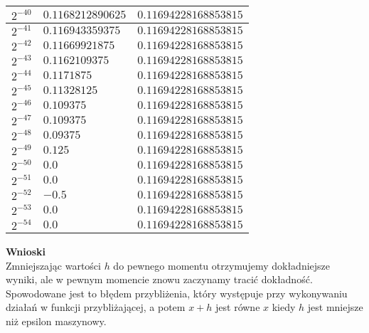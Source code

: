 \documentclass{article}
\begin{document}
\begin{center}
\begin{tabular}{|l|l|l|}
		$2^{-40}$ & $0.1168212890625$     & $0.11694228168853815$ \\
		\hline
		$2^{-41}$ & $0.116943359375$      & $0.11694228168853815$ \\
		\hline
		$2^{-42}$ & $0.11669921875$       & $0.11694228168853815$ \\
		\hline
		$2^{-43}$ & $0.1162109375$        & $0.11694228168853815$ \\
		\hline
		$2^{-44}$ & $0.1171875$           & $0.11694228168853815$ \\
		\hline
		$2^{-45}$ & $0.11328125$          & $0.11694228168853815$ \\
		\hline
		$2^{-46}$ & $0.109375$            & $0.11694228168853815$ \\
		\hline
		$2^{-47}$ & $0.109375$            & $0.11694228168853815$ \\
		\hline
		$2^{-48}$ & $0.09375$             & $0.11694228168853815$ \\
		\hline
		$2^{-49}$ & $0.125$               & $0.11694228168853815$ \\
		\hline
		$2^{-50}$ & $0.0$                 & $0.11694228168853815$ \\
		\hline
		$2^{-51}$ & $0.0$                 & $0.11694228168853815$ \\
		\hline
		$2^{-52}$ & $-0.5$                & $0.11694228168853815$ \\
		\hline
		$2^{-53}$ & $0.0$                 & $0.11694228168853815$ \\
		\hline
		$2^{-54}$ & $0.0$                 & $0.11694228168853815$ \\
		\hline
	\end{tabular}
\end{center}

\noindent \textbf{Wnioski} \\
Zmniejszając wartości $h$ do pewnego momentu otrzymujemy dokładniejsze wyniki, ale
w pewnym momencie znowu zaczynamy tracić dokładność. Spowodowane jest to błędem przybliżenia,
który występuje przy wykonywaniu działań w funkcji przybliżającej, a potem $x + h$ jest równe
$x$ kiedy $h$ jest mniejsze niż epsilon maszynowy.
\end{document}

